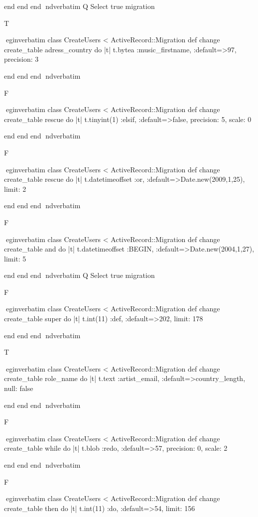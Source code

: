     end 
  end 
end
nd{verbatim}
Q
 Select true migration

T

egin{verbatim}
 class CreateUsers < ActiveRecord::Migration 
  def change 
    create_table adress_country do |t| 
      t.bytea :music_firstname, :default=>97, precision: 3
    
    end 
  end 
end
nd{verbatim}

F

egin{verbatim}
 class CreateUsers < ActiveRecord::Migration 
  def change 
    create_table rescue do |t| 
      t.tinyint(1) :elsif, :default=>false, precision: 5, scale: 0
    
    end 
  end 
end
nd{verbatim}

F

egin{verbatim}
 class CreateUsers < ActiveRecord::Migration 
  def change 
    create_table rescue do |t| 
      t.datetimeoffset :or, :default=>Date.new(2009,1,25), limit: 2
    
    end 
  end 
end
nd{verbatim}

F

egin{verbatim}
 class CreateUsers < ActiveRecord::Migration 
  def change 
    create_table and do |t| 
      t.datetimeoffset :BEGIN, :default=>Date.new(2004,1,27), limit: 5
    
    end 
  end 
end
nd{verbatim}
Q
 Select true migration

F

egin{verbatim}
 class CreateUsers < ActiveRecord::Migration 
  def change 
    create_table super do |t| 
      t.int(11) :def, :default=>202, limit: 178
    
    end 
  end 
end
nd{verbatim}

T

egin{verbatim}
 class CreateUsers < ActiveRecord::Migration 
  def change 
    create_table role_name do |t| 
      t.text :artist_email, :default=>country_length, null: false
    
    end 
  end 
end
nd{verbatim}

F

egin{verbatim}
 class CreateUsers < ActiveRecord::Migration 
  def change 
    create_table while do |t| 
      t.blob :redo, :default=>57, precision: 0, scale: 2
    
    end 
  end 
end
nd{verbatim}

F

egin{verbatim}
 class CreateUsers < ActiveRecord::Migration 
  def change 
    create_table then do |t| 
      t.int(11) :do, :default=>54, limit: 156
    

